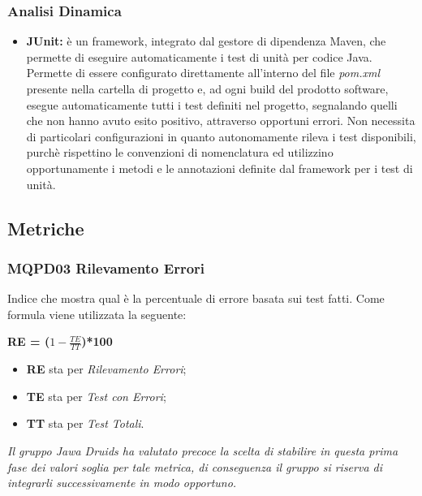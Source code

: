 \subsubsection{Analisi Dinamica} \label{ProcessiDiSupportoVerificaStrumentiAnalisiDinamica}
\begin{itemize}
	\item \textbf{JUnit:} è un framework, integrato dal gestore di dipendenza Maven, che permette di eseguire automaticamente i test di unità per codice Java.
	Permette di essere configurato direttamente all’interno del file \textit{pom.xml} presente nella cartella di progetto e, ad ogni build del prodotto software, esegue automaticamente tutti i test definiti nel progetto, segnalando quelli che non hanno avuto esito positivo, attraverso opportuni errori.
	Non necessita di particolari configurazioni in quanto autonomamente rileva i test disponibili, purchè rispettino le convenzioni di nomenclatura ed utilizzino opportunamente i metodi e le annotazioni definite dal framework per i test di unità.	
\end{itemize}
\subsection{Metriche}\label{ProcessiDiSupportoVerificaMetriche}
\subsubsection{MQPD03 Rilevamento Errori}\label{ProcessiDiSupportoVerificaMetricheMQPD03RilevamentoErrori}
Indice che mostra qual è la percentuale di errore basata sui test fatti.
Come formula viene utilizzata la seguente:
\begin{center}
	\textbf{RE = ($1-\frac{TE}{TT}$)*100}
\end{center}
\begin{itemize}
	\item \textbf{RE} sta per \textit{Rilevamento Errori};
	\item \textbf{TE} sta per \textit{Test con Errori};
	\item \textbf{TT} sta per \textit{Test Totali}.
\end{itemize}
\textit{Il gruppo \textit{Jawa Druids} ha valutato precoce la scelta di stabilire in questa prima fase dei valori soglia per tale metrica, di conseguenza il gruppo si riserva di integrarli successivamente in modo opportuno.}

